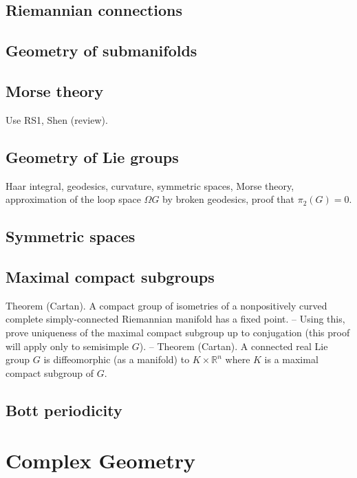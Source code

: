 \subsection{Riemannian connections}



\subsection{Geometry of submanifolds}



\subsection{Morse theory}

Use RS1, Shen (review). 


\subsection{Geometry of Lie groups}
Haar integral, geodesics, curvature, symmetric spaces, Morse theory, approximation of the loop space $\Omega G$ by broken geodesics, proof that $\pi_2(G)=0$.


\subsection{Symmetric spaces}


\subsection{Maximal compact subgroups}

Theorem (Cartan). A compact group of isometries of a nonpositively curved complete simply-connected Riemannian manifold has a fixed point.
--
Using this, prove uniqueness of the maximal compact subgroup up to conjugation (this proof will apply only to semisimple $G$).
--
Theorem (Cartan). A connected real Lie group $G$ is diffeomorphic (as a manifold) to $K\times\mathbb{R}^n$ where $K$ is a maximal compact subgroup of $G$.






\subsection{Bott periodicity}




\clearpage
\section{Complex Geometry}


